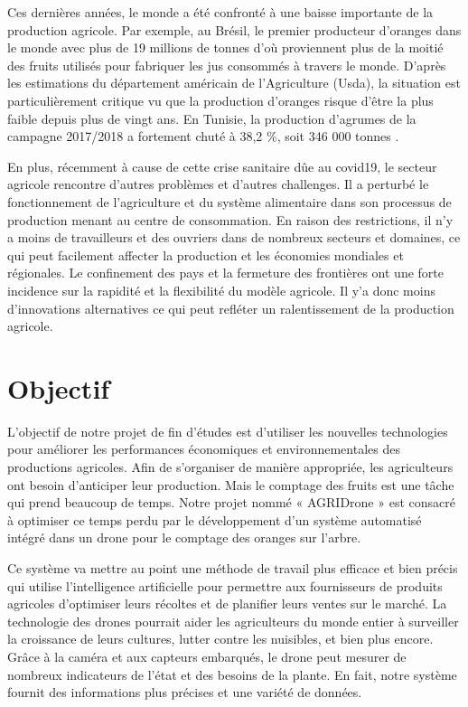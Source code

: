 Ces dernières années, le monde a été confronté à une baisse importante de la production agricole. Par exemple, au Brésil, le premier producteur d'oranges dans le monde avec plus de 19 millions de tonnes d'où proviennent plus de la moitié des fruits utilisés pour fabriquer les jus consommés à travers le monde. D'après les estimations du département américain de l'Agriculture (Usda), la situation est particulièrement critique vu que la production d'oranges risque d'être la plus faible depuis plus de vingt ans. En Tunisie, la production d'agrumes de la campagne 2017/2018 a fortement chuté à 38,2 \%, soit 346 000 tonnes \cite{onagri2017/2018}.

En plus, récemment à cause de cette crise sanitaire dûe au covid19, le secteur agricole rencontre d'autres problèmes et d'autres challenges. Il a perturbé le fonctionnement de l'agriculture et du système alimentaire dans son processus de production menant au centre de consommation. En raison des restrictions, il n'y a moins de travailleurs et des ouvriers dans de nombreux secteurs et domaines, ce qui peut facilement affecter la production et les économies mondiales et régionales. Le confinement des pays et la fermeture des frontières ont une forte incidence sur la rapidité et la flexibilité du modèle agricole. Il y'a donc moins d'innovations alternatives ce qui peut refléter un ralentissement de la production agricole.

\section{Objectif }
L'objectif de notre projet de fin d'études est d'utiliser les nouvelles technologies pour améliorer les performances économiques et environnementales des productions agricoles. Afin de s'organiser de manière appropriée, les agriculteurs ont besoin d'anticiper leur production. Mais le comptage des fruits est une tâche qui prend beaucoup de temps. Notre projet nommé « AGRIDrone » est consacré à optimiser ce temps perdu par le développement d'un système automatisé intégré dans un drone pour le comptage des oranges sur l'arbre. 


Ce système va mettre au point une méthode de travail plus efficace et bien précis qui utilise l'intelligence artificielle pour permettre aux fournisseurs de produits agricoles d'optimiser leurs récoltes et de planifier leurs ventes sur le marché. La technologie des drones pourrait aider les agriculteurs du monde entier à surveiller la croissance de leurs cultures, lutter contre les nuisibles, et bien plus encore. Grâce à la caméra et aux capteurs embarqués, le drone peut mesurer de nombreux indicateurs de l'état et des besoins de la plante. En fait, notre système fournit des informations plus précises et une variété de données.

